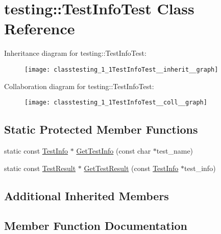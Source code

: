 \hypertarget{classtesting_1_1TestInfoTest}{}\section{testing\+:\+:Test\+Info\+Test Class Reference}
\label{classtesting_1_1TestInfoTest}


Inheritance diagram for testing\+:\+:Test\+Info\+Test\+:
\nopagebreak
\begin{figure}[H]
\begin{center}
\leavevmode
\texttt{[image: classtesting\_1\_1TestInfoTest\_\_inherit\_\_graph]}
\end{center}
\end{figure}


Collaboration diagram for testing\+:\+:Test\+Info\+Test\+:
\nopagebreak
\begin{figure}[H]
\begin{center}
\leavevmode
\texttt{[image: classtesting\_1\_1TestInfoTest\_\_coll\_\_graph]}
\end{center}
\end{figure}
\subsection*{Static Protected Member Functions}
\begin{DoxyCompactItemize}
\item 
static const \hyperlink{classtesting_1_1TestInfo}{Test\+Info} $\ast$ \hyperlink{classtesting_1_1TestInfoTest_a4140c1302bf53c7f1375a23923624f04}{Get\+Test\+Info} (const char $\ast$test\+\_\+name)
\item 
static const \hyperlink{classtesting_1_1TestResult}{Test\+Result} $\ast$ \hyperlink{classtesting_1_1TestInfoTest_a154b3679b1aa00ad037ce46eb60d18c3}{Get\+Test\+Result} (const \hyperlink{classtesting_1_1TestInfo}{Test\+Info} $\ast$test\+\_\+info)
\end{DoxyCompactItemize}
\subsection*{Additional Inherited Members}


\subsection{Member Function Documentation}
